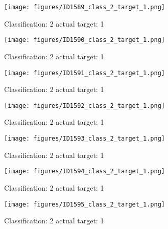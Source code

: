 \begin{figure}[h!]
\begin{center}
\texttt{[image: figures/ID1589\_class\_2\_target\_1.png]}
\end{center}
\caption{ Classification: 2 actual target: 1}
\label{fig:ID1589_class_2_target_1}
\end{figure}
\begin{figure}[h!]
\begin{center}
\texttt{[image: figures/ID1590\_class\_2\_target\_1.png]}
\end{center}
\caption{ Classification: 2 actual target: 1}
\label{fig:ID1590_class_2_target_1}
\end{figure}
\begin{figure}[h!]
\begin{center}
\texttt{[image: figures/ID1591\_class\_2\_target\_1.png]}
\end{center}
\caption{ Classification: 2 actual target: 1}
\label{fig:ID1591_class_2_target_1}
\end{figure}
\begin{figure}[h!]
\begin{center}
\texttt{[image: figures/ID1592\_class\_2\_target\_1.png]}
\end{center}
\caption{ Classification: 2 actual target: 1}
\label{fig:ID1592_class_2_target_1}
\end{figure}
\begin{figure}[h!]
\begin{center}
\texttt{[image: figures/ID1593\_class\_2\_target\_1.png]}
\end{center}
\caption{ Classification: 2 actual target: 1}
\label{fig:ID1593_class_2_target_1}
\end{figure}
\begin{figure}[h!]
\begin{center}
\texttt{[image: figures/ID1594\_class\_2\_target\_1.png]}
\end{center}
\caption{ Classification: 2 actual target: 1}
\label{fig:ID1594_class_2_target_1}
\end{figure}
\begin{figure}[h!]
\begin{center}
\texttt{[image: figures/ID1595\_class\_2\_target\_1.png]}
\end{center}
\caption{ Classification: 2 actual target: 1}
\label{fig:ID1595_class_2_target_1}
\end{figure}
